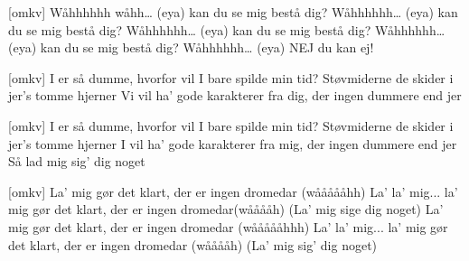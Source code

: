\documentclass[a4paper,11pt]{article}
\begin{document}
\begin{song}
[omkv] Wåhhhhhh wåhh… (eya) kan du se mig bestå dig?
Wåhhhhhh… (eya) kan du se mig bestå dig?
Wåhhhhhh… (eya) kan du se mig bestå dig?
Wåhhhhhh… (eya) kan du se mig bestå dig?
Wåhhhhhh… (eya) NEJ du kan ej!

[omkv] I er så dumme, hvorfor vil I bare spilde min tid?
Støvmiderne de skider i jer’s tomme hjerner 
Vi vil ha’ gode karakterer fra dig, der ingen dummere end jer

[omkv] I er så dumme, hvorfor vil I bare spilde min tid?
Støvmiderne de skider i jer’s tomme hjerner 
I vil ha’ gode karakterer fra mig, der ingen dummere end jer
Så lad mig sig’ dig noget

[omkv] La' mig gør det klart, der er ingen dromedar
(wåååååhh)
La' la' mig... la' mig gør det klart, der er ingen dromedar(wååååh)
(La’ mig sige dig noget)
La' mig gør det klart, der er ingen dromedar
(wåååååhhh)
La' la' mig... la' mig gør det klart, der er ingen dromedar  (wååååh)
(La' mig sig’ dig noget)

\end{song}
\end{document}
